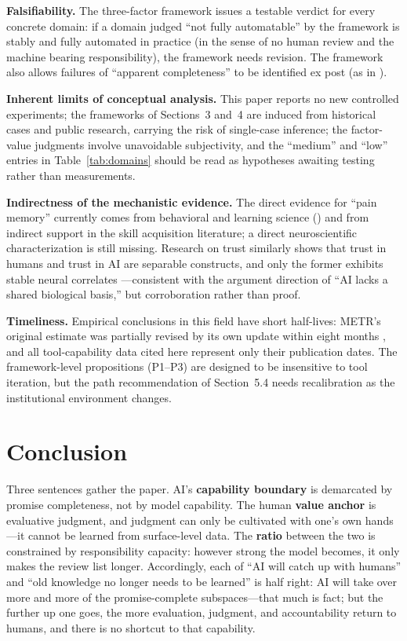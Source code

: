 \documentclass[11pt]{article}
\begin{document}
\textbf{Falsifiability.} The three-factor framework issues a testable
verdict for every concrete domain: if a domain judged ``not fully
automatable'' by the framework is stably and fully automated in practice
(in the sense of no human review and the machine bearing responsibility),
the framework needs revision. The framework also allows failures of
``apparent completeness'' to be identified ex post (as in \cite{fcic}).

\textbf{Inherent limits of conceptual analysis.} This paper reports no new
controlled experiments; the frameworks of Sections~3 and~4 are induced from
historical cases and public research, carrying the risk of single-case
inference; the factor-value judgments involve unavoidable subjectivity, and
the ``medium'' and ``low'' entries in Table~\ref{tab:domains} should be
read as hypotheses awaiting testing rather than measurements.

\textbf{Indirectness of the mechanistic evidence.} The direct evidence for
``pain memory'' currently comes from behavioral and learning science
(\cite{anthropic_rct,alanazi}) and from indirect support in the skill
acquisition literature; a direct neuroscientific characterization is still
missing. Research on trust similarly shows that trust in humans and trust
in AI are separable constructs, and only the former exhibits stable neural
correlates \cite{trust}---consistent with the argument direction of ``AI
lacks a shared biological basis,'' but corroboration rather than proof.

\textbf{Timeliness.} Empirical conclusions in this field have short
half-lives: METR's original estimate was partially revised by its own
update within eight months \cite{metr}, and all tool-capability data cited
here represent only their publication dates. The framework-level
propositions (P1--P3) are designed to be insensitive to tool iteration, but
the path recommendation of Section~5.4 needs recalibration as the
institutional environment changes.

\section{Conclusion}
Three sentences gather the paper. AI's \textbf{capability boundary} is
demarcated by promise completeness, not by model capability. The human
\textbf{value anchor} is evaluative judgment, and judgment can only be
cultivated with one's own hands---it cannot be learned from surface-level
data. The \textbf{ratio} between the two is constrained by responsibility
capacity: however strong the model becomes, it only makes the review list
longer. Accordingly, each of ``AI will catch up with humans'' and ``old
knowledge no longer needs to be learned'' is half right: AI will take over
more and more of the promise-complete subspaces---that much is fact; but
the further up one goes, the more evaluation, judgment, and accountability
return to humans, and there is no shortcut to that capability.
\end{document}
